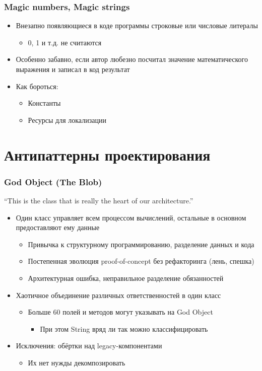 \documentclass[xetex,mathserif,serif]{beamer}
\begin{document}
	\begin{frame}
		\frametitle{Magic numbers, Magic strings}
		\begin{itemize}
			\item Внезапно появляющиеся в коде программы строковые или числовые литералы
			\begin{itemize}
				\item 0, 1 и т.д. не считаются
			\end{itemize}
			\item Особенно забавно, если автор любезно посчитал значение математического выражения и записал в код результат
			\item Как бороться:
			\begin{itemize}
				\item Константы
				\item Ресурсы для локализации
			\end{itemize}
		\end{itemize}
	\end{frame}

	\section{Антипаттерны проектирования}

	\begin{frame}
		\frametitle{God Object (The Blob)}
		``This is the class that is really the heart of our architecture.''
		\begin{itemize}
			\item Один класс управляет всем процессом вычислений, остальные в основном предоставляют ему данные
			\begin{itemize}
				\item Привычка к структурному программированию, разделение данных и кода
				\item Постепенная эволюция proof-of-concept без рефакторинга (лень, спешка)
				\item Архитектурная ошибка, неправильное разделение обязанностей
			\end{itemize}
			\item Хаотичное объединение различных ответственностей в один класс
			\begin{itemize}
				\item Больше 60 полей и методов могут указывать на God Object
				\begin{itemize}
					\item При этом String вряд ли так можно классифицировать
				\end{itemize}
			\end{itemize}
			\item Исключения: обёртки над legacy-компонентами
			\begin{itemize}
				\item Их нет нужды декомпозировать
			\end{itemize}
		\end{itemize}
	\end{frame}
\end{document}
